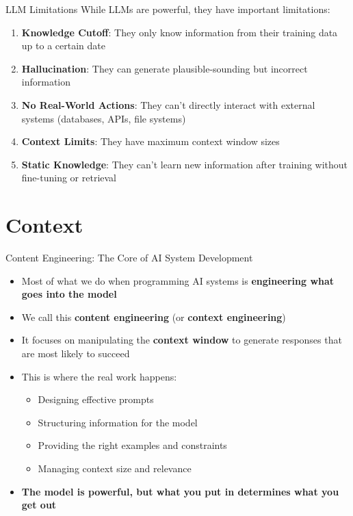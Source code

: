 \documentclass[aspectratio=169]{beamer}
\begin{document}
\begin{frame}{LLM Limitations}
While LLMs are powerful, they have important limitations:
\begin{enumerate}
    \item \textbf{Knowledge Cutoff}: They only know information from their training data up to a certain date
    \item \textbf{Hallucination}: They can generate plausible-sounding but incorrect information
    \item \textbf{No Real-World Actions}: They can't directly interact with external systems (databases, APIs, file systems)
    \item \textbf{Context Limits}: They have maximum context window sizes
    \item \textbf{Static Knowledge}: They can't learn new information after training without fine-tuning or retrieval
\end{enumerate}
\end{frame}



\section{Context}

\begin{frame}{Content Engineering: The Core of AI System Development}
\begin{itemize}
    \item Most of what we do when programming AI systems is \textbf{engineering what goes into the model}
    \item We call this \textbf{content engineering} (or \textbf{context engineering})
    \item It focuses on manipulating the \textbf{context window} to generate responses that are most likely to succeed
    \item This is where the real work happens:
    \begin{itemize}
        \item Designing effective prompts
        \item Structuring information for the model
        \item Providing the right examples and constraints
        \item Managing context size and relevance
    \end{itemize}
    \item \textbf{The model is powerful, but what you put in determines what you get out}
\end{itemize}
\end{frame}
\end{document}
